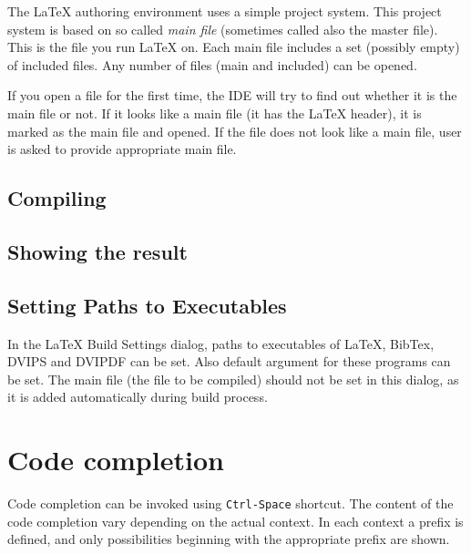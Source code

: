 \documentclass{article}
\newcommand{\lenv}{\LaTeX{} authoring environment\xspace}
\begin{document}
\label{sec:project:system}

The \lenv{} uses a simple project system. This project system is based on so called
\emph{main file} (sometimes called also the master file). This is the
file you run \LaTeX{} on. Each main file includes a set (possibly empty) of included
files. Any number of files (main and included) can be opened.

If you open a file for the first time, the IDE will try to find out whether it is
the main file or not. If it looks like a main file (it has the \LaTeX{} header),
it is marked as the main file and opened. If the file does not look like a main file,
user is asked to provide appropriate main file.

\subsection{Compiling}

\subsection{Showing the result}

\subsection{Setting Paths to Executables}

\label{ssec:setting:paths}

In the LaTeX Build Settings dialog, paths to executables of \LaTeX, BibTex, DVIPS and DVIPDF
can be set. Also default argument for these programs can be set. The main file
(the file to be compiled) should not be set in this dialog, as it is added automatically
during build process.


%

\section{Code completion}

\label{sec:completion}

Code completion can be invoked using \verb+Ctrl-Space+ shortcut. The content
of the code completion vary depending on the actual context. In each context
a prefix is defined, and only possibilities beginning with the appropriate
prefix are shown.
\end{document}
